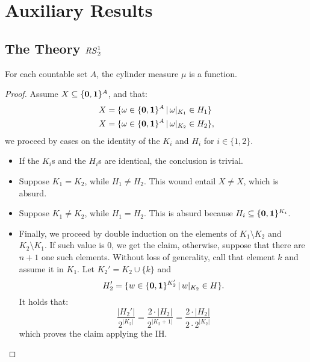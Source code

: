 
\section{Auxiliary Results}
\label{sec:auxres}

\subsection{The Theory ${\mathit{RS}^1_2}$}

\begin{remark}
  \label{rem:mufun}
  For each countable set $A$, the cylinder measure $\mu$ is a function.
\end{remark}
\begin{proof}
  Assume $X \subseteq \{\mathbf{0}, \mathbf{1}\}^A$, and that:
  \begin{align*}
  X&=\{\omega \in \{\mathbf{0}, \mathbf{1}\}^A\, |\, \omega|_{K_1} \in H_1\}\\
  X&=\{\omega \in \{\mathbf{0}, \mathbf{1}\}^A\, |\, \omega|_{K_2} \in H_2\},
\end{align*}
we proceed by cases on the identity of the $K_i$ and $H_i$ for $i \in\{ 1,2\}$.
\begin{itemize}
  \item If the $K_i$s and the $H_i$s are identical, the conclusion is trivial.
  \item  Suppose $K_1=K_2$, while $H_1 \neq H_2$. This wound entail
  $X \neq X$, which is absurd.
  \item Suppose $K_1\neq K_2$, while $H_1 = H_2$. This is absurd because
  $H_i \subseteq \{\mathbf{0}, \mathbf{1}\}^{K_i}$.
  \item Finally, we proceed by double induction on the elements
  of $K_1\setminus K_2$ and $ K_2\setminus K_1$. If such value is $0$,
  we get the claim, otherwise, suppose that there are $n+1$ one such elements.
  Without loss of generality, call that element $k$ and assume it in $K_1$.
  Let $K_2' = K_2 \cup \{k\}$ and
  $$
  H_2'=\{w \in \{\mathbf{0}, \mathbf{1}\}^{K_2'}\, |\,  w|_{K_2} \in H\}.
  $$
  It holds that:
  $$
  \frac{|H_2'|}{2^{|K_2|}} = \frac{2\cdot |H_2|}{2^{|K_2+1|}}=
  \frac{2\cdot |H_2|}{2\cdot2^{|K_2|}}
  $$
  which proves the claim applying the IH.
\end{itemize}
\end{proof}



